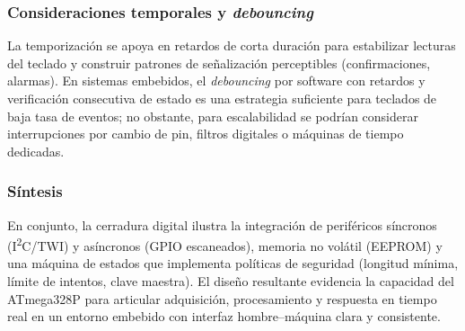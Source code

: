 \subsubsection{Consideraciones temporales y \textit{debouncing}}
La temporización se apoya en retardos de corta duración para estabilizar lecturas del teclado y construir patrones de señalización perceptibles (confirmaciones, alarmas). En sistemas embebidos, el \textit{debouncing} por software con retardos y verificación consecutiva de estado es una estrategia suficiente para teclados de baja tasa de eventos; no obstante, para escalabilidad se podrían considerar interrupciones por cambio de pin, filtros digitales o máquinas de tiempo dedicadas.

\subsubsection{Síntesis}
En conjunto, la cerradura digital ilustra la integración de periféricos síncronos (I\textsuperscript{2}C/TWI) y asíncronos (GPIO escaneados), memoria no volátil (EEPROM) y una máquina de estados que implementa políticas de seguridad (longitud mínima, límite de intentos, clave maestra). El diseño resultante evidencia la capacidad del ATmega328P para articular adquisición, procesamiento y respuesta en tiempo real en un entorno embebido con interfaz hombre–máquina clara y consistente.

